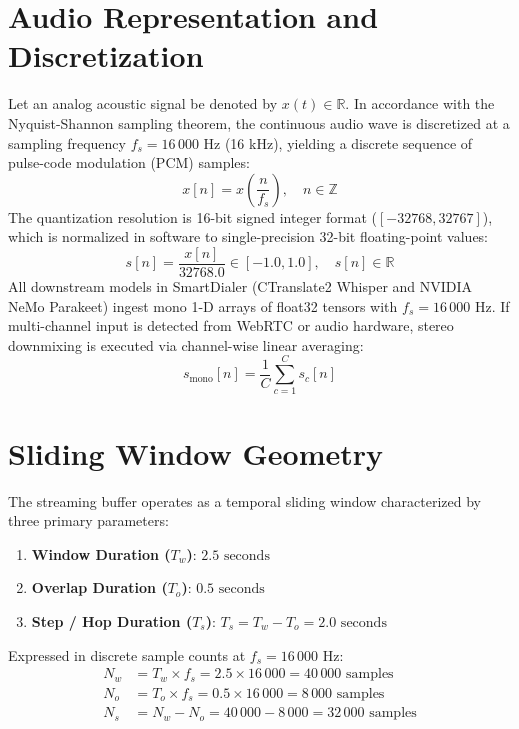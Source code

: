 \documentclass[11pt,a4paper,titlepage]{report}
\begin{document}
\section{Audio Representation and Discretization}
Let an analog acoustic signal be denoted by $x(t) \in \mathbb{R}$. In accordance with the Nyquist-Shannon sampling theorem, the continuous audio wave is discretized at a sampling frequency $f_s = 16\,000\text{ Hz}$ (16 kHz), yielding a discrete sequence of pulse-code modulation (PCM) samples:
\begin{equation}
    x[n] = x\left(\frac{n}{f_s}\right), \quad n \in \mathbb{Z}
\end{equation}
The quantization resolution is 16-bit signed integer format ($[-32768, 32767]$), which is normalized in software to single-precision 32-bit floating-point values:
\begin{equation}
    s[n] = \frac{x[n]}{32768.0} \in [-1.0, 1.0], \quad s[n] \in \mathbb{R}
\end{equation}
All downstream models in SmartDialer (CTranslate2 Whisper and NVIDIA NeMo Parakeet) ingest mono 1-D arrays of float32 tensors with $f_s = 16\,000\text{ Hz}$. If multi-channel input is detected from WebRTC or audio hardware, stereo downmixing is executed via channel-wise linear averaging:
\begin{equation}
    s_{\text{mono}}[n] = \frac{1}{C} \sum_{c=1}^{C} s_c[n]
\end{equation}

\section{Sliding Window Geometry}
The streaming buffer operates as a temporal sliding window characterized by three primary parameters:
\begin{enumerate}
    \item \textbf{Window Duration ($T_w$)}: $2.5\text{ seconds}$
    \item \textbf{Overlap Duration ($T_o$)}: $0.5\text{ seconds}$
    \item \textbf{Step / Hop Duration ($T_s$)}: $T_s = T_w - T_o = 2.0\text{ seconds}$
\end{enumerate}

Expressed in discrete sample counts at $f_s = 16\,000\text{ Hz}$:
\begin{align}
    N_w &= T_w \times f_s = 2.5 \times 16\,000 = 40\,000\text{ samples} \\
    N_o &= T_o \times f_s = 0.5 \times 16\,000 = 8\,000\text{ samples} \\
    N_s &= N_w - N_o = 40\,000 - 8\,000 = 32\,000\text{ samples}
\end{align}
\end{document}
